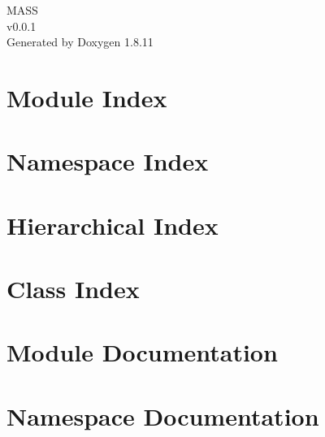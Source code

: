 \documentclass[twoside]{book}
\newcommand{\+}{\discretionary{\mbox{\scriptsize$\hookleftarrow$}}{}{}}
\newcommand{\clearemptydoublepage}{%
  \newpage{\pagestyle{empty}\cleardoublepage}%
}
\begin{document}
\hypersetup{pageanchor=false,
             bookmarksnumbered=true,
             pdfencoding=unicode
            }
\begin{titlepage}
\vspace*{7cm}
\begin{center}%
{\Large M\+A\+SS \\[1ex]\large v0.\+0.\+1 }\\
\vspace*{1cm}
{\large Generated by Doxygen 1.8.11}\\
\end{center}
\end{titlepage}
\clearemptydoublepage
\tableofcontents
\clearemptydoublepage
{}
\hypersetup{pageanchor=true}

\chapter{Module Index}

\chapter{Namespace Index}

\chapter{Hierarchical Index}

\chapter{Class Index}

\chapter{Module Documentation}


\chapter{Namespace Documentation}

\end{document}
